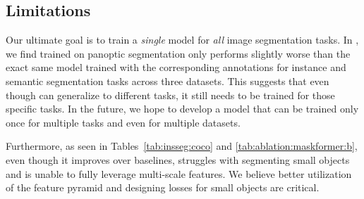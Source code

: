 \subsection{Limitations}
Our ultimate goal is to train a {\em single} model for \emph{all} image segmentation tasks. In , we find \modelname trained on panoptic segmentation only performs slightly worse than the exact same model trained with the corresponding annotations for instance and semantic segmentation tasks across three datasets.
This suggests that even though \modelname can generalize to different tasks, it still needs to be trained for those specific tasks.
In the future, we hope to develop a model that can be trained only once for multiple tasks and even for multiple datasets.

Furthermore, as seen in Tables~\ref{tab:insseg:coco} and \ref{tab:ablation:maskformer:b}, even though it improves over baselines, \modelname struggles with segmenting small objects and is unable to fully leverage multi-scale features. We believe better utilization of the feature pyramid and designing losses for small objects are critical.




















